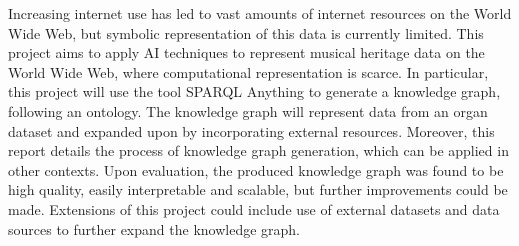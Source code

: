 Increasing internet use has led to vast amounts of internet resources on the World Wide Web, but symbolic representation of this data is currently limited. This project aims to apply AI techniques to represent musical heritage data on the World Wide Web, where computational representation is scarce. In particular, this project will use the tool SPARQL Anything to generate a knowledge graph, following an ontology. The knowledge graph will represent data from an organ dataset and expanded upon by incorporating external resources. Moreover, this report details the process of knowledge graph generation, which can be applied in other contexts. Upon evaluation, the produced knowledge graph was found to be high quality, easily interpretable and scalable, but further improvements could be made. Extensions of this project could include use of external datasets and data sources to further expand the knowledge graph. 

